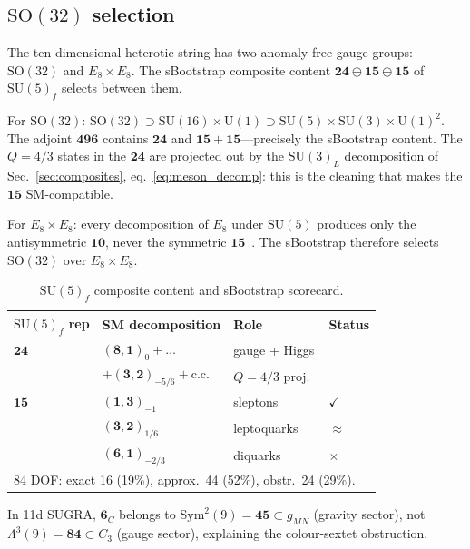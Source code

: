 \documentclass[aps,prd,twocolumn,showpacs,preprintnumbers,superscriptaddress,floatfix]{revtex4-2}
\newcommand{\SU}{\mathrm{SU}}
\newcommand{\UU}{\mathrm{U}}
\newcommand{\SO}{\mathrm{SO}}
\begin{document}
\subsection{$\SO(32)$ selection}

The ten-dimensional heterotic string has two anomaly-free gauge
groups: $\SO(32)$ and $E_8 \times E_8$.
The sBootstrap composite content
$\mathbf{24} \oplus \mathbf{15} \oplus \overline{\mathbf{15}}$
of $\SU(5)_f$ selects between them.

For $\SO(32)$:
$\SO(32) \supset \SU(16) \times \UU(1) \supset \SU(5) \times
\SU(3) \times \UU(1)^2$.
The adjoint $\mathbf{496}$ contains $\mathbf{24}$ and
$\mathbf{15} + \overline{\mathbf{15}}$---precisely the
sBootstrap content.
The $Q = 4/3$ states in the $\mathbf{24}$ are projected out by
the $\SU(3)_L$ decomposition of
Sec.~\ref{sec:composites}, eq.~\eqref{eq:meson_decomp}: this is
the cleaning that makes the $\mathbf{15}$ SM-compatible.

For $E_8 \times E_8$: every decomposition of $E_8$ under
$\SU(5)$ produces only the antisymmetric $\mathbf{10}$, never
the symmetric $\mathbf{15}$~\cite{Rivero:2024epjc}.
The sBootstrap therefore selects $\SO(32)$ over
$E_8 \times E_8$.

\begin{table}
\centering\small
\caption{$\SU(5)_f$ composite content and sBootstrap scorecard.}
\label{tab:SU5_scorecard}
\begin{tabular}{llll}
\hline
$\SU(5)_f$ rep & SM decomposition & Role & Status \\
\hline
$\mathbf{24}$ & $(\mathbf{8},\mathbf{1})_0 + \ldots$ & gauge + Higgs & \\
  & $+ (\mathbf{3},\mathbf{2})_{-5/6} + \text{c.c.}$ & $Q{=}4/3$ proj.\ & \\
$\mathbf{15}$ & $(\mathbf{1},\mathbf{3})_{-1}$ & sleptons & $\checkmark$ \\
  & $(\mathbf{3},\mathbf{2})_{1/6}$ & leptoquarks & $\approx$ \\
  & $(\mathbf{6},\mathbf{1})_{-2/3}$ & diquarks & $\times$ \\
\hline
\multicolumn{4}{l}{84 DOF: exact 16 (19\%), approx.\ 44 (52\%), obstr.\ 24 (29\%).} \\
\hline
\end{tabular}
\end{table}

In 11d SUGRA, $\mathbf{6}_C$ belongs to
$\mathrm{Sym}^2(9) = \mathbf{45} \subset g_{MN}$ (gravity
sector), not $\Lambda^3(9) = \mathbf{84} \subset C_3$ (gauge
sector), explaining the colour-sextet obstruction.
\end{document}
